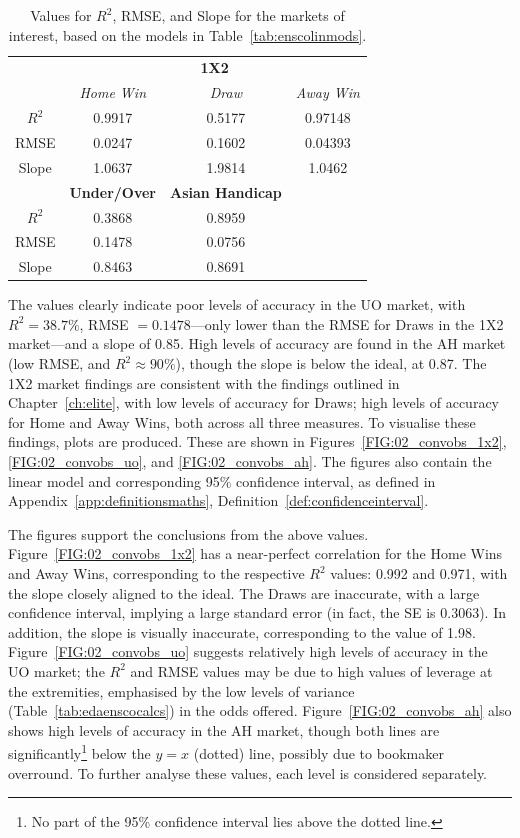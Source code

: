 \documentclass[a4paper,10pt]{report}
\begin{document}
\begin{table}[h!]\begin{center}\begin{tabular}{c||ccc}
	&\multicolumn{3}{|c}{\textbf{1X2}} \\
	 & \textit{Home Win} & \textit{Draw} &\textit{Away Win}\\ \hline\hline
	$R^2$ 	& 0.9917 &0.5177 &0.97148 \\ 
	RMSE  	& 0.0247 &0.1602 &0.04393 \\ 
	Slope	& 1.0637 &1.9814 & 1.0462\\ \hline	
			& \textbf{Under/Over} & \textbf{Asian Handicap} & \\ \hline \hline
	$R^2$ 	& 0.3868 & 0.8959 &\\
	RMSE  	& 0.1478 & 0.0756 & \\
	Slope	& 0.8463 & 0.8691 &
\end{tabular}\end{center}\caption{Values for $R^2$, RMSE, and Slope for the markets of interest, based on the models in Table~\ref{tab:enscolinmods}.}\label{tab:ensco_values}\end{table}

The values clearly indicate poor levels of accuracy in the UO market, with $R^2 = 38.7\%$, RMSE  $=0.1478$---only lower than the RMSE for Draws in the 1X2 market---and a slope of 0.85. High levels of accuracy are found in the AH market (low RMSE, and $R^2\approx90\%$), though the slope is below the ideal, at 0.87. The 1X2 market findings are consistent with the findings outlined in Chapter~\ref{ch:elite}, with low levels of accuracy for Draws; high levels of accuracy for Home and Away Wins, both across all three measures. To visualise these findings, plots are produced. These are shown in Figures~\ref{FIG:02_convobs_1x2}, \ref{FIG:02_convobs_uo}, and \ref{FIG:02_convobs_ah}. The figures also contain the linear model and corresponding 95\% confidence interval, as defined in Appendix~\ref{app:definitionsmaths}, Definition~\ref{def:confidenceinterval}. \vspace{3mm}

The figures support the conclusions from the above values. Figure~\ref{FIG:02_convobs_1x2} has a near-perfect correlation for the Home Wins and Away Wins, corresponding to the respective $R^2$ values: 0.992 and 0.971, with the slope closely aligned to the ideal. The Draws are inaccurate, with a large confidence interval, implying a large standard error (in fact, the SE is 0.3063). In addition, the slope is visually inaccurate, corresponding to the value of 1.98. Figure~\ref{FIG:02_convobs_uo} suggests relatively high levels of accuracy in the UO market; the $R^2$ and RMSE values may be due to high values of leverage at the extremities, emphasised by the low levels of variance (Table~\ref{tab:edaenscocalcs}) in the odds offered. Figure~\ref{FIG:02_convobs_ah} also shows high levels of accuracy in the AH market, though both lines are significantly\footnote{No part of the 95\% confidence interval lies above the dotted line.} below the $y=x$ (dotted) line, possibly due to bookmaker overround. To further analyse these values, each level is considered separately.
\pagebreak 
\end{document}
